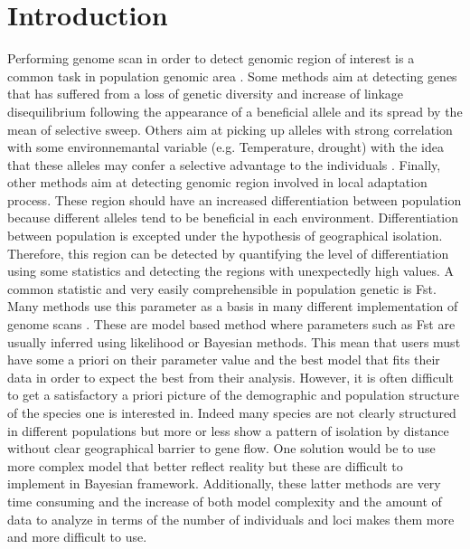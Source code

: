 \documentclass[nogrid]{MBE}%
\begin{document}
\keyword{}

\maketitle



\section{{Introduction}\label{sec:Intro}}


Performing genome scan in order to detect genomic region of interest is a common task in population genomic area \citep{Foll2008,Frichot2013,Luu2016,Vatsiou2015}. Some methods aim at detecting  genes that has suffered from a loss of genetic diversity and increase of linkage disequilibrium following the appearance of a beneficial allele and its spread by the mean of selective sweep. Others aim at picking up alleles with strong correlation with some environnemantal variable (e.g. Temperature, drought) with the idea that these alleles may confer a selective advantage to the individuals  \citep{Coop2010,Frichot2013}. Finally, other methods aim at detecting genomic region involved in local adaptation process. These region should have an increased differentiation between population because different alleles tend to be beneficial in each environment. Differentiation between population is excepted under the hypothesis of geographical isolation. Therefore, this region can be detected by quantifying the level of differentiation using some statistics and detecting the regions with unexpectedly high values. A common statistic and very easily comprehensible in population genetic is Fst. Many methods use this parameter as a basis in many different implementation of genome scans \citep{Bazin2010,DeVillemereuil2015,Foll2008}. These are model based method where parameters such as Fst are usually inferred using likelihood or Bayesian methods. This mean that users must have some a priori on their parameter value and the best model that fits their data in order to expect the best from their analysis.
	However, it is often difficult to get a satisfactory a priori picture of the demographic and population structure of the species one is interested in. Indeed many species are not clearly structured in different populations but more or less show a pattern of isolation by distance without clear geographical barrier to gene flow. One solution would be to use more complex model that better reflect reality but these are difficult to implement in Bayesian framework. Additionally, these latter methods are very time consuming and the increase of both model complexity and the amount of data to analyze in terms of the number of individuals and loci makes them more and more difficult to use.
\end{document}
